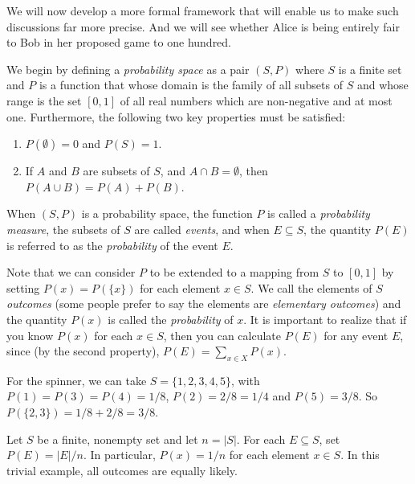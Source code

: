 We will now develop a more formal framework that will enable us
to make such discussions far more precise.  And we will see whether
Alice is being entirely fair to Bob in her proposed game to one
hundred.  

We begin by defining a \textit{probability space} as a pair $(S,P)$ 
where $S$ is a finite set and $P$ is a function that whose domain is
the family of all subsets of $S$ and whose range is the set $[0,1]$ of
all real numbers which are non-negative and at most one.  Furthermore,
the following two key properties must be satisfied:

\begin{enumerate}
\item $P(\emptyset)=0$ and $P(S)=1$.
\item If $A$ and $B$ are subsets of $S$, and $A\cap B=\emptyset$,
then $P(A\cup B)= P(A)+P(B)$.
\end{enumerate}

When $(S,P)$ is a probability space, the function $P$ is called a 
\textit{probability measure}, the subsets of $S$ are called
\textit{events}, and when $E\subseteq S$, the quantity $P(E)$ is 
referred to as the \textit{probability} of the event $E$.  

Note that we can consider
$P$ to be extended to a mapping from $S$ to $[0,1]$ by
setting $P(x)=P(\{x\})$ for each element $x\in S$.
We call the elements of $S$ \textit{outcomes}
(some people prefer to say the elements are \textit{elementary
outcomes}) and the quantity $P(x)$ is called the \textit{probability}
of $x$.  It is important to realize that if you know $P(x)$ for
each $x\in S$, then you can calculate $P(E)$ for any event $E$,
since (by the second property), $P(E)=\sum_{x\in X}P(x)$. 

\begin{example}
For the spinner, we can take $S=\{1,2,3,4,5\}$, with $P(1)=P(3)=P(4)=1/8$,
$P(2)=2/8=1/4$ and $P(5)=3/8$.  So $P(\{2,3\})=1/8+2/8=3/8$.
\end{example}

\begin{example}
Let $S$ be a finite, nonempty set and let $n=|S|$.  
For each $E\subseteq S$, set $P(E)=|E|/n$.  In particular, $P(x)=1/n$ 
for each element $x\in S$.  In this trivial example, all outcomes 
are equally likely.
\end{example}

